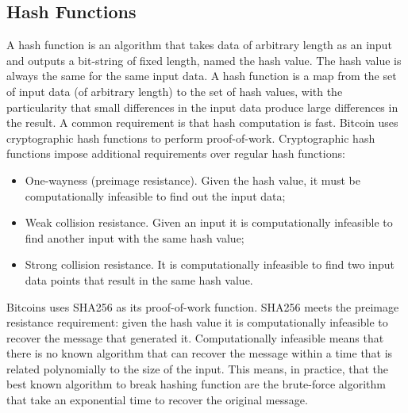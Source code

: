 \documentclass{article}
\begin{document}
\subsection*{Hash Functions}
A hash function is an algorithm that takes data of arbitrary length as an input and outputs a bit-string of fixed length, named the hash value. The hash value is always the same for the same input data. A hash function is a map from the set of input data (of arbitrary length) to the set of hash values, with the particularity that small differences in the input data produce large differences in the result. A common requirement is that hash computation is fast. Bitcoin uses cryptographic hash functions to perform proof-of-work. Cryptographic hash functions impose additional requirements over regular hash functions:
\begin{itemize}
    \item One-wayness (preimage resistance). Given the hash value, it must be computationally infeasible to find out the input data;
    \item Weak collision resistance. Given an input it is computationally infeasible to find another input with the same hash value;
    \item Strong collision resistance. It is computationally infeasible to find two input data points that result in the same hash value.
\end{itemize}
Bitcoins uses SHA256 as its proof-of-work function. SHA256 meets the preimage resistance requirement: given the hash value it is computationally infeasible to recover the message that generated it. Computationally infeasible means that there is no known algorithm that can recover the message within a time that is related polynomially to the size of the input. This means, in practice, that the best known algorithm to break hashing function are the brute-force algorithm that take an exponential time to recover the original message.
\end{document}
